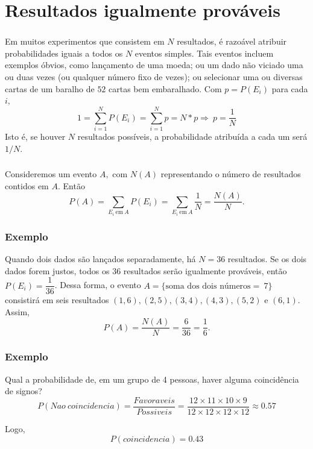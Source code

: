 \documentclass[14pt,aspectratio=1610]{beamer}
\begin{document}
\section{Resultados igualmente prováveis}
\begin{frame}{}
\frametitle{}
\begin{block}{}
\justifying
Em muitos experimentos que consistem em $N$ resultados, é razoável atribuir probabilidades iguais a todos os $N$ eventos simples. Tais eventos incluem exemplos óbvios, como lançamento de uma moeda; ou um dado não viciado uma ou duas vezes (ou qualquer número fixo de vezes); ou selecionar uma ou diversas cartas de um baralho de $52$ cartas bem embaralhado. Com $p=P(E_{i})$ para cada $i,$
$${\displaystyle 1=\sum_{i=1}^{N}P(E_{i})=\sum_{i=1}^{N}p=N*p\Rightarrow\ p=\dfrac{1}{N}}$$
Isto é, se houver $N$ resultados possíveis, a probabilidade atribuída a cada um será $1/N.$ 
\end{block}
\end{frame}

\begin{frame}{}
\frametitle{}
\begin{block}{}
\justifying
Consideremos um evento $A,$ com $N(A)$ representando o número de resultados contidos em $A.$ Então $$P(A)=\sum_{E_{i}\ \textrm{em}\ A}P(E_{i})=\sum_{E_{i}\ \textrm{em}\ A}\dfrac{1}{N}=\dfrac{N(A)}{N}.$$
\end{block}
\end{frame}

\begin{frame}{}
\frametitle{Exemplo}
\begin{block}{}
\justifying
Quando dois dados são lançados separadamente, há $N=36$ resultados. Se os dois dados forem justos, todos os $36$ resultados serão igualmente prováveis, então
$P(E_{i})=\dfrac{1}{36}$. Dessa forma, o evento $A=\{\textrm{soma dos dois números}=\ 7\}$ consistirá em seis resultados $(1,6), (2,5), (3,4), (4,3), (5,2)$ e $(6,1).$ Assim, $$P(A)=\dfrac{N(A)}{N}=\dfrac{6}{36}=\dfrac{1}{6}.$$
\end{block}
\end{frame}

\begin{frame}{}
\frametitle{Exemplo}
\begin{block}{}
\justifying
Qual a probabilidade de, em um grupo de 4 pessoas, haver alguma coincidência de signos?
\pause
$$P(Nao\ coincidencia)=\dfrac{Favoraveis}{Possiveis}=\dfrac{12\times 11\times 10\times 9}{12\times 12\times 12\times 12}\approx 0.57$$

Logo, $$P(coincidencia)=0.43$$
\end{block}
\end{frame}
\end{document}
